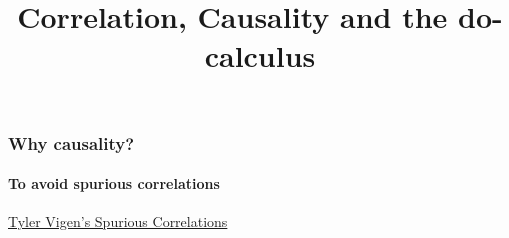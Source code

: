 


\title{Correlation, Causality and the do-calculus}

\maketitle

\begin{frame}
\frametitle{Why causality?}
\framesubtitle{To avoid spurious correlations}
    \centering

\href{https://www.tylervigen.com/spurious-correlations}{Tyler Vigen's Spurious Correlations}
\end{frame}

